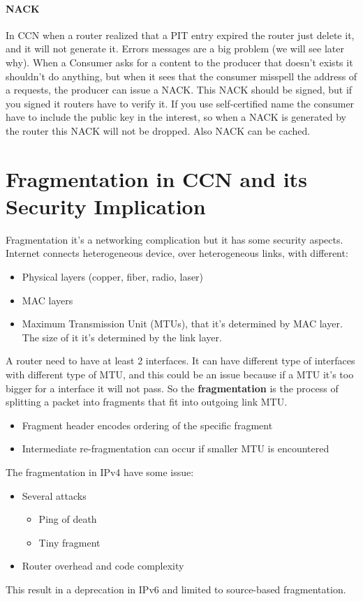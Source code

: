 \paragraph*{NACK} In CCN when a router realized that a PIT entry expired the
router just delete it, and it will not generate it. Errors messages are a big
problem (we will see later why). When a Consumer asks for a content to the
producer that doesn't exists it shouldn't do anything, but when it sees that
the consumer misspell the address of a requests, the producer can issue a NACK.
This NACK should be signed, but if you signed it routers have to verify it.
If you use self-certified name the consumer have to include the public key in
the interest, so when a NACK is generated by the router this NACK will not be
dropped. Also NACK can be cached.

\section{Fragmentation in CCN and its Security Implication}
Fragmentation it's a networking complication but it has some security aspects.
Internet connects heterogeneous device, over heterogeneous links, with
different:
\begin{itemize}
  \item Physical layers (copper, fiber, radio, laser)
  \item MAC layers
  \item Maximum Transmission Unit (MTUs), that it's determined by MAC layer.
The size of it it's determined by the link layer.
\end{itemize}

A router need to have at least 2 interfaces. It can have different type of
interfaces with different type of MTU, and this could be an issue because if a
MTU it's too bigger for a interface it will not pass.
So the \textbf{fragmentation} is the process of splitting a packet into
fragments that fit into outgoing link MTU.
\begin{itemize}
  \item Fragment header encodes ordering of the specific fragment
  \item Intermediate re-fragmentation can occur if smaller MTU is encountered
\end{itemize}

The fragmentation in IPv4 have some issue:
\begin{itemize}
  \item Several attacks
  \begin{itemize}
    \item Ping of death
    \item Tiny fragment
  \end{itemize}
  \item Router overhead and code complexity
\end{itemize}
This result in a deprecation in IPv6 and limited to source-based fragmentation.

